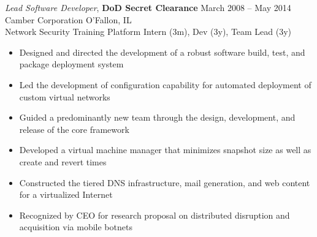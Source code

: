 \documentclass[margin,line]{resume}
\begin{document}
\begin{resume}
{\sl Lead Software Developer}, \textbf{\small DoD Secret Clearance}  \hfill  March 2008 -- May 2014\\
Camber Corporation                                                   \hfill  O'Fallon, IL\\
{\small Network Security Training Platform  \hfill  Intern (3m), Dev (3y), Team Lead (3y)}
\begin{itemize} \itemsep -2pt %
\small\item Designed and directed the development of a robust software build, test, and package deployment system
\small\item Led the development of configuration capability for automated deployment of custom virtual networks
\small\item Guided a predominantly new team through the design, development, and release of the core framework
\small\item Developed a virtual machine manager that minimizes snapshot size as well as create and revert times
\small\item Constructed the tiered DNS infrastructure, mail generation, and web content for a virtualized Internet
\small\item Recognized by CEO for research proposal on distributed disruption and acquisition via mobile botnets
\end{itemize}


\end{resume}
\end{document}
